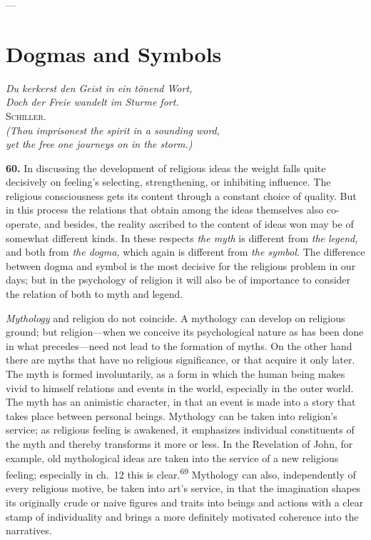 \documentclass[12pt,a4paper]{book}
\newcommand{\opage}[1]{\marginnote{\footnotesize\textit{[#1]}}}
\begin{document}
\begin{center}---\end{center}

\section{Dogmas and Symbols}
\label{sec:dogmas}

\begin{flushright}
\opage{133}
\textit{Du kerkerst den Geist in ein tönend Wort,}\\
\textit{Doch der Freie wandelt im Sturme fort.}\\[2pt]
\textsc{Schiller}.\\[4pt]
\textit{(Thou imprisonest the spirit in a sounding word,}\\
\textit{yet the free one journeys on in the storm.)}
\end{flushright}

\bigskip

\noindent\textbf{60.} In discussing the development of religious ideas the weight falls
quite decisively on feeling's selecting, strengthening, or inhibiting influence. The
religious consciousness gets its content through a constant choice of quality. But in this
process the relations that obtain among the ideas themselves also co-operate, and besides,
the reality ascribed to the content of ideas won may be of somewhat different kinds. In
these respects \emph{the myth} is different from \emph{the legend,} and both from \emph{the
dogma,} which again is different from \emph{the symbol.} The difference between dogma and
symbol is the most decisive for the religious problem in our days; but in the psychology of
religion it will also be of importance to consider the relation of both to myth and legend.

\emph{Mythology} and religion do not coincide. A mythology can develop on religious ground;
but religion---when we conceive its psychological nature as has been done in what
precedes---need not lead to the formation of myths. On the other hand there are myths that
have no religious significance, or that acquire it only later. The myth is formed
involuntarily, as a form in which the human being makes vivid to himself relations and events
in the world, especially in the outer world. The myth has an animistic character, in that an
event is made into a story that takes place between personal beings. Mythology can be taken
into religion's service; as religious feeling is awakened, it emphasizes individual
constituents of the myth and thereby transforms it more or less. In the Revelation of John,
for example, old mythological ideas are taken into the service of a new religious feeling;
especially in ch.~12 this is clear.\textsuperscript{69} Mythology can also, independently of
every religious motive, be taken into art's service, in that the imagination shapes its
originally crude or naive figures and traits into beings 
\opage{134}and actions with a clear stamp of
individuality and brings a more definitely motivated coherence into the narratives.
\end{document}
